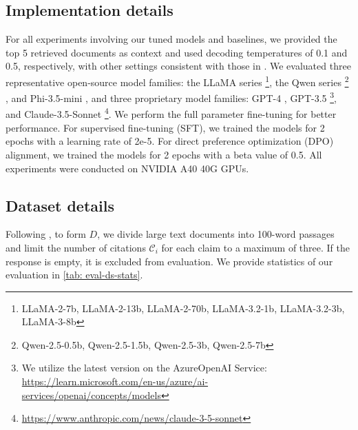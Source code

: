 \documentclass{article} %
\renewcommand{\cite}[1]{\citep{#1}}
\begin{document}
\subsection{Implementation details} \label{app:implement-details}
For all experiments involving our tuned models and baselines, we provided the top 5 retrieved documents as context and used decoding temperatures of 0.1 and 0.5, respectively, with other settings consistent with those in \citet{gao2023enabling}. We evaluated three representative open-source model families: the LLaMA series \footnote{LLaMA-2-7b, LLaMA-2-13b, LLaMA-2-70b, LLaMA-3.2-1b, LLaMA-3.2-3b, LLaMA-3-8b}\cite{touvron2023llama2openfoundation, dubey2024llama3herdmodels}, the Qwen series \footnote{Qwen-2.5-0.5b, Qwen-2.5-1.5b, Qwen-2.5-3b, Qwen-2.5-7b} \cite{qwen2}, and Phi-3.5-mini \cite{abdin2024phi3technicalreporthighly}, and three proprietary model families: GPT-4 \cite{openai2024gpt4technicalreport}, GPT-3.5 \cite{brown2020languagemodelsfewshotlearners} \footnote{We utilize the latest version on the AzureOpenAI Service: \url{https://learn.microsoft.com/en-us/azure/ai-services/openai/concepts/models}}, and Claude-3.5-Sonnet \footnote{\url{https://www.anthropic.com/news/claude-3-5-sonnet}}. We perform the full parameter fine-tuning for better performance. For supervised fine-tuning (SFT), we trained the models for 2 epochs with a learning rate of 2e-5. For direct preference optimization (DPO) alignment, we trained the models for 2 epochs with a beta value of 0.5. All experiments were conducted on NVIDIA A40 40G GPUs.

\subsection{Dataset details} \label{app:dataset-details}
Following \citet{liu-etal-2023-evaluating, gao2023enabling}, to form $D$, we divide large text documents into 100-word passages and limit the number of citations \(\mathcal{C}_i\) for each claim to a maximum of three. If the response is empty, it is excluded from evaluation. We provide statistics of our evaluation in \cref{tab: eval-ds-stats}. 

\begin{table}[H]
    \caption{Statistics of the evaluation dataset.}
    \label{tab: eval-ds-stats}
    \centering
    
\end{table}
\end{document}
